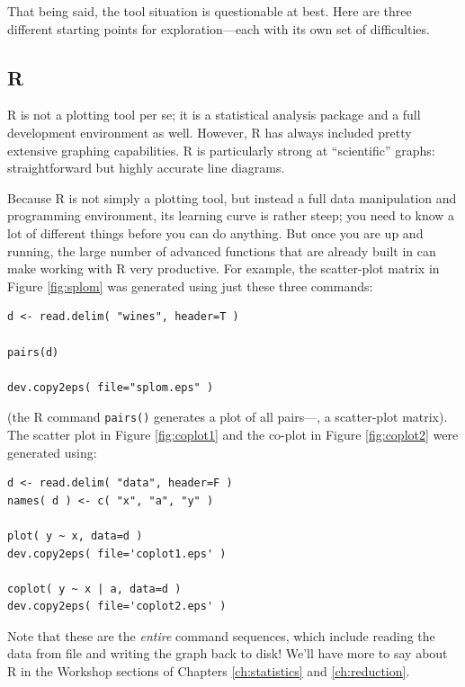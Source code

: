 That being said, the tool situation is questionable at best.  Here
are three different starting points for exploration---each with its
own set of difficulties.

\vspace*{-9pt}
\subsection{R}


R is not a plotting tool per se; it is a statistical analysis package
and a full development environment as well. However, R has always
included pretty extensive graphing capabilities. R is particularly
strong at ``scientific'' graphs: straightforward but highly accurate
line diagrams.

Because R is not simply a plotting tool, but instead a full data
manipulation and programming environment, its learning curve is rather
steep; you need to know a lot of different things before you can do
anything. But once you are up and running, the large number of
advanced functions that are already built in can make working with R
very productive. For example, the scatter-plot matrix in Figure
\ref{fig:splom} was generated using just these three commands:

\begin{verbatim}
d <- read.delim( "wines", header=T )

pairs(d)

dev.copy2eps( file="splom.eps" )
\end{verbatim}

(the R command \texttt{pairs()} generates a plot of all pairs---\ie, a
scatter-plot matrix). The scatter plot in Figure \ref{fig:coplot1} and
the co-plot in Figure \ref{fig:coplot2} were generated using:

\begin{verbatim}
d <- read.delim( "data", header=F )
names( d ) <- c( "x", "a", "y" )

plot( y ~ x, data=d )
dev.copy2eps( file='coplot1.eps' )

coplot( y ~ x | a, data=d )
dev.copy2eps( file='coplot2.eps' )
\end{verbatim}

Note that these are the \emph{entire} command sequences, which include
reading the data from file and writing the graph back to disk! We'll
have more to say about R in the Workshop sections of Chapters
\ref{ch:statistics} and \ref{ch:reduction}.

